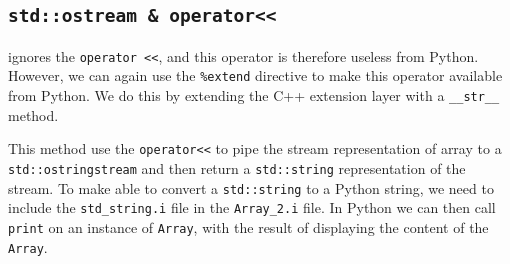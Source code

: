 \subsection{ \texttt{std::ostream \& operator<<}}%
\swig ignores the \texttt{operator <<}, %
and this operator is therefore useless from Python. However, we can again use the \texttt{\%extend} directive to make this operator available from Python. We do this by extending the C++ extension layer with a \texttt{\_\_str\_\_} method.
\begin{code}
This method use the \texttt{operator<<} %
to pipe the stream representation of array to a \texttt{std::ostringstream} and then return a \texttt{std::string} representation of the stream. To make \swig able to convert a \texttt{std::string} to a Python string, we need to include the \texttt{std\_string.i} file in the \texttt{Array\_2.i} file. In Python we can then call \texttt{print} on an instance of \texttt{Array}, with the result of displaying the content of the \texttt{Array}.\par


\end{code}
